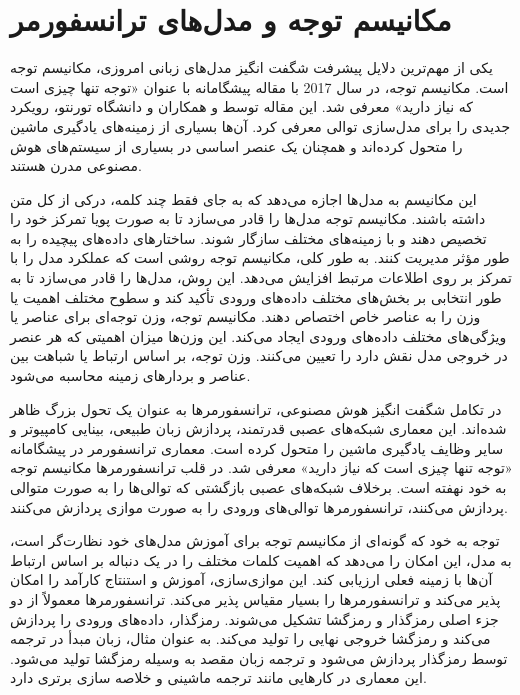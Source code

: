 \section{مکانیسم توجه و مدل‌های ترانسفورمر}
\hspace{30pt}
یکی از مهم‌ترین دلایل پیشرفت شگفت انگیز مدل‌های زبانی امروزی، مکانیسم توجه است.  مکانیسم توجه، در سال 2017 با مقاله پیشگامانه با عنوان «توجه تنها چیزی است که نیاز دارید» معرفی شد. این مقاله توسط  و همکاران  و دانشگاه تورنتو،  رویکرد جدیدی را برای مدل‌سازی توالی معرفی کرد.\cite{vaswani2017attention}
آن‌ها بسیاری از زمینه‌های یادگیری ماشین را متحول کرده‌اند و همچنان یک عنصر اساسی در بسیاری از سیستم‌های هوش مصنوعی مدرن هستند.

 این مکانیسم به مدل‌ها اجازه می‌دهد که به جای فقط چند کلمه، درکی از کل متن داشته باشند. مکانیسم توجه مدل‌ها را قادر می‌سازد تا به صورت پویا تمرکز خود را تخصیص دهند و با زمینه‌های مختلف سازگار شوند. ساختار‌های داده‌های پیچیده را به طور مؤثر مدیریت کنند. به طور کلی، مکانیسم توجه روشی است که عملکرد مدل را با تمرکز بر روی اطلاعات مرتبط افزایش می‌دهد. این روش، مدل‌ها را قادر می‌سازد تا به طور انتخابی بر بخش‌های مختلف داده‌های ورودی تأکید کند و سطوح مختلف اهمیت یا وزن را به عناصر خاص اختصاص دهند.
مکانیسم توجه، وزن توجه‌ای برای عناصر یا ویژگی‌های مختلف داده‌های ورودی ایجاد می‌کند. این وزن‌ها میزان اهمیتی که هر عنصر در خروجی مدل نقش دارد را تعیین می‌کنند. وزن توجه، بر اساس ارتباط یا شباهت بین عناصر و بردار‌های زمینه محاسبه می‌شود.

در تکامل شگفت انگیز هوش مصنوعی، ترانسفورمرها به عنوان یک تحول بزرگ ظاهر شده‌اند. این معماری شبکه‌های عصبی قدرتمند، پردازش زبان طبیعی، بینایی کامپیوتر و سایر وظایف یادگیری ماشین را متحول کرده است. معماری ترانسفورمر در پیشگامانه «توجه تنها چیزی است که نیاز دارید» معرفی شد.
در قلب ترانسفورمرها مکانیسم توجه به خود نهفته است. برخلاف شبکه‌های عصبی بازگشتی که توالی‌ها را به صورت متوالی پردازش می‌کنند، ترانسفورمر‌ها توالی‌های ورودی را به صورت موازی پردازش می‌کنند.

توجه به خود که گونه‌ای از مکانیسم توجه برای آموزش مدل‌های خود نظارت‌گر است، به مدل، این امکان را می‌دهد که اهمیت کلمات مختلف را در یک دنباله بر اساس ارتباط آن‌ها با زمینه فعلی ارزیابی کند. این موازی‌سازی، آموزش و استنتاج کارآمد را امکان پذیر می‌کند و ترانسفورمرها را بسیار مقیاس پذیر می‌کند.
ترانسفورمرها معمولاً از دو جزء اصلی رمزگذار و رمز‌گشا تشکیل می‌شوند. رمزگذار، داده‌های ورودی را پردازش می‌کند و رمزگشا خروجی نهایی را تولید می‌کند. به عنوان مثال، زبان مبدأ در ترجمه توسط رمزگذار پردازش می‌شود و ترجمه زبان مقصد به وسیله رمزگشا تولید می‌شود. این معماری در کارهایی مانند ترجمه ماشینی و خلاصه سازی برتری دارد.

